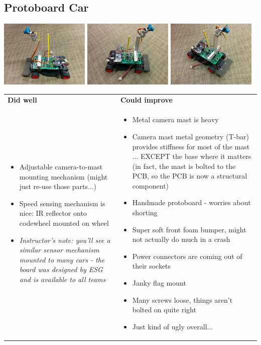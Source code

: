 \documentclass{article}
\begin{document}
\subsection{Protoboard Car}
{\centering
\includegraphics[width=0.32\textwidth]{images-dis2-carcritiques/protoboard-side1}
\includegraphics[width=0.32\textwidth]{images-dis2-carcritiques/protoboard-side2}
\includegraphics[width=0.32\textwidth]{images-dis2-carcritiques/protoboard-angle} \\}

\begin{tabularx}{\textwidth}{X X}
\textbf{Did well} & \textbf{Could improve} \\
\begin{itemize}
  \item Adjustable camera-to-mast mounting mechanism (might just re-use those parts...)
  \item Speed sensing mechanism is nice: IR reflector onto codewheel mounted on wheel
  \item \textit{Instructor's note: you'll see a similar sensor mechanism mounted to many cars - the board was designed by ESG and is available to all teams}
\end{itemize}
&
\begin{itemize}
  \item Metal camera mast is heavy
  \item Camera mast metal geometry (T-bar) provides stiffness for most of the mast ... EXCEPT the base where it matters (in fact, the mast is bolted to the PCB, so the PCB is now a structural component)
  \item Handmade protoboard - worries about shorting
  \item Super soft front foam bumper, might not actually do much in a crash
  \item Power connectors are coming out of their sockets
  \item Janky flag mount
  \item Many screws loose, things aren't bolted on quite right
  \item Just kind of ugly overall...
\end{itemize}
\end{tabularx}
\end{document}
